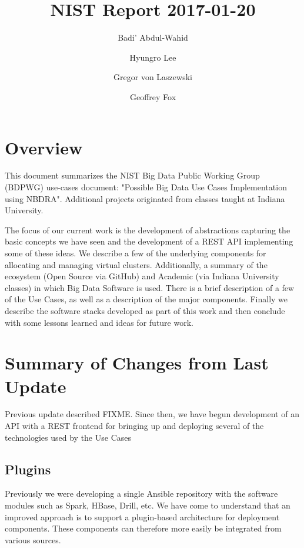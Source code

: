 \documentclass[9pt,twocolumn,twoside]{styles/osajnl}
\title{NIST Report 2017-01-20}
\author[1]{Badi' Abdul-Wahid}
\author[1]{Hyungro Lee}
\author[1]{Gregor von Laszewski}
\author[1,*]{Geoffrey Fox}
\affil[1]{School of Informatics and Computing, Bloomington, IN 47408, U.S.A.}
\affil[*]{Corresponding authors: gcf@indiana.edu}
\begin{document}
\maketitle



\section{Overview}

This document summarizes the NIST Big Data Public Working Group
(BDPWG) use-cases document: "Possible Big Data Use Cases
Implementation using NBDRA". Additional projects originated from
classes taught at Indiana University.


The focus of our current work is the development of abstractions
capturing the basic concepts we have seen and the development of a
REST API implementing some of these ideas. We describe a few of the
underlying components for allocating and managing virtual
clusters. Additionally, a summary of the ecosystem (Open Source via
GitHub) and Academic (via Indiana University classes) in which Big
Data Software is used. There is a brief description of a few of the
Use Cases, as well as a description of the major components. Finally
we describe the software stacks developed as part of this work and
then conclude with some lessons learned and ideas for future work.



\section{Summary of Changes from Last Update}

Previous update described FIXME.  Since then, we have begun
development of an API with a REST frontend for bringing up and
deploying several of the technologies used by the Use Cases



\subsection{Plugins}

Previously we were developing a single Ansible repository with the
software modules such as Spark, HBase, Drill, etc. We have come to
understand that an improved approach is to support a plugin-based
architecture for deployment components. These components can therefore
more easily be integrated from various sources.
\end{document}
